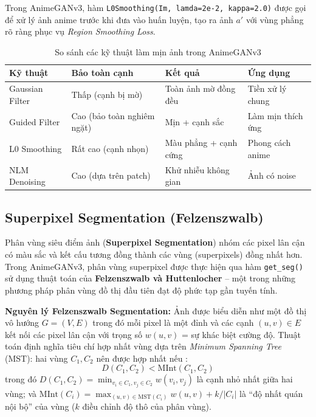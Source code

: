 Trong AnimeGANv3, hàm \texttt{L0Smoothing(Im, lamda=2e-2, kappa=2.0)} được gọi để xử lý
ảnh anime trước khi đưa vào huấn luyện, tạo ra ảnh $a'$ với vùng phẳng rõ ràng phục vụ
\textit{Region Smoothing Loss}.

\begin{table}[H]
\caption{So sánh các kỹ thuật làm mịn ảnh trong AnimeGANv3}
\label{tab:smoothing_comparison}
\centering
\begin{tabular}{|l|p{3cm}|p{3cm}|p{3.5cm}|}
\hline
\textbf{Kỹ thuật} & \textbf{Bảo toàn cạnh} & \textbf{Kết quả} & \textbf{Ứng dụng} \\
\hline
Gaussian Filter & Thấp (cạnh bị mờ) & Toàn ảnh mờ đồng đều & Tiền xử lý chung \\
\hline
Guided Filter & Cao (bảo toàn nghiêm ngặt) & Mịn + cạnh sắc & Làm mịn thích ứng \\
\hline
L0 Smoothing & Rất cao (cạnh nhọn) & Màu phẳng + cạnh cứng & Phong cách anime\\
\hline
NLM Denoising & Cao (dựa trên patch) & Khử nhiễu không gian & Ảnh có noise \\
\hline
\end{tabular}
\end{table}

\subsection{Superpixel Segmentation (Felzenszwalb)}
\label{subsec:superpixel}

Phân vùng siêu điểm ảnh (\textbf{Superpixel Segmentation}) nhóm các pixel lân cận
có màu sắc và kết cấu tương đồng thành các vùng (superpixels) đồng nhất hơn. Trong
AnimeGANv3, phân vùng superpixel được thực hiện qua hàm \texttt{get\_seg()} sử dụng
thuật toán của \textbf{Felzenszwalb và Huttenlocher} \cite{Felzenszwalb2004} --
một trong những phương pháp phân vùng đồ thị đầu tiên đạt độ phức tạp gần tuyến tính.

\textbf{Nguyên lý Felzenszwalb Segmentation:} Ảnh được biểu diễn như một đồ thị vô hướng
$G = (V, E)$ trong đó mỗi pixel là một đỉnh và các cạnh $(u,v) \in E$ kết nối các pixel
lân cận với trọng số $w(u,v)$ = sự khác biệt cường độ. Thuật toán định nghĩa tiêu chí
hợp nhất vùng dựa trên \textit{Minimum Spanning Tree} (MST): hai vùng $C_1, C_2$ nên
được hợp nhất nếu \cite{Felzenszwalb2004}:
\begin{equation}
\label{eq:felzenszwalb}
D(C_1, C_2) < \mathrm{MInt}(C_1, C_2)
\end{equation}
trong đó $D(C_1, C_2) = \min_{v_i \in C_1, v_j \in C_2} w(v_i, v_j)$ là cạnh nhỏ nhất
giữa hai vùng; và $\mathrm{MInt}(C_i) = \max_{(u,v) \in \mathrm{MST}(C_i)} w(u,v) + k/|C_i|$
là ``độ nhất quán nội bộ'' của vùng ($k$ điều chỉnh độ thô của phân vùng).


